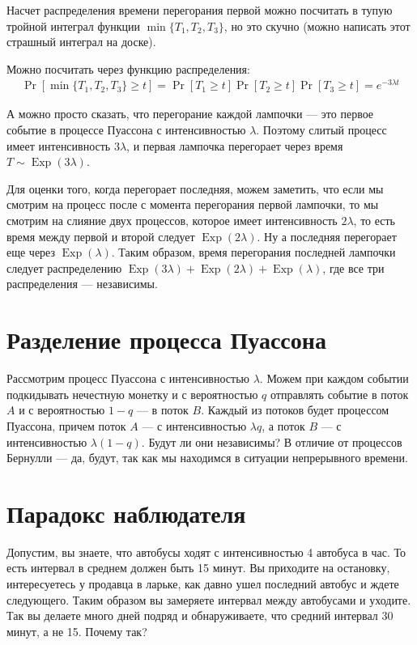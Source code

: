 \documentclass[12pt]{article}
\DeclareMathOperator{\Exp}{Exp}
\begin{document}
Насчет распределения времени перегорания первой можно посчитать в тупую тройной интеграл функции $\min\{T_1, T_2, T_3\}$, но это скучно (можно написать этот страшный интеграл на доске).

Можно посчитать через функцию распределения:
\begin{align*}
  \Pr[\min\{T_1, T_2, T_3\} \ge t] = \Pr[T_1 \ge t] \Pr[T_2 \ge t] \Pr[T_3 \ge t] = e^{-3 \lambda t}
\end{align*}

А можно просто сказать, что перегорание каждой лампочки --- это первое событие в процессе Пуассона с интенсивностью $\lambda$. Поэтому слитый процесс имеет интенсивность $3\lambda$, и первая лампочка перегорает через время $T \sim \Exp(3\lambda)$.

Для оценки того, когда перегорает последняя, можем заметить, что если мы смотрим на процесс после с момента перегорания первой лампочки, то мы смотрим на слияние двух процессов, которое имеет интенсивность $2\lambda$, то есть время между первой и второй следует $\Exp(2\lambda)$. Ну а последняя перегорает еще через $\Exp(\lambda)$. Таким образом, время перегорания последней лампочки следует распределению $\Exp(3\lambda) + \Exp(2\lambda) + \Exp(\lambda)$, где все три распределения --- независимы. 


\section{Разделение процесса Пуассона}

Рассмотрим процесс Пуассона с интенсивностью $\lambda$. Можем при каждом событии подкидывать нечестную монетку и с вероятностью $q$ отправлять событие в поток $A$ и с вероятностью $1 - q$ --- в поток $B$. Каждый из потоков будет процессом Пуассона, причем поток $A$ --- с интенсивностью $\lambda q$, а поток $B$ --- с интенсивностью $\lambda (1 - q)$. Будут ли они независимы? В отличие от процессов Бернулли --- да, будут, так как мы находимся в ситуации непрерывного времени.

\section{Парадокс наблюдателя}

Допустим, вы знаете, что автобусы ходят с интенсивностью 4 автобуса в час. То есть интервал в среднем должен быть 15 минут. Вы приходите на остановку, интересуетесь у продавца в ларьке, как давно ушел последний автобус и ждете следующего. Таким образом вы замеряете интервал между автобусами и уходите. Так вы делаете много дней подряд и обнаруживаете, что средний интервал 30 минут, а не 15. Почему так?
\end{document}
